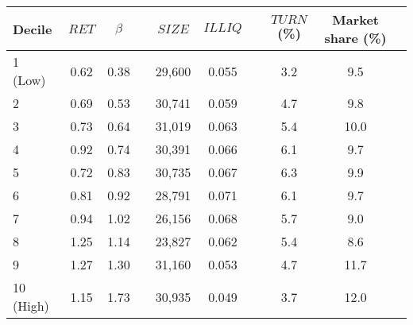 \begin{tabular}{@{}lccccccccc@{}}
	\toprule
	Decile & $\textit{RET}$ & $\beta$ && $\textit{SIZE}$ & $\textit{ILLIQ}$ && $\textit{TURN}$ (\%) & Market share (\%) \\ \midrule
1 (Low) & 0.62 & 0.38 && 29,600 & 0.055 && 3.2 & 9.5 \\
2       & 0.69 & 0.53 && 30,741 & 0.059 && 4.7 & 9.8 \\
3       & 0.73 & 0.64 && 31,019 & 0.063 && 5.4 & 10.0 \\
4       & 0.92 & 0.74 && 30,391 & 0.066 && 6.1 & 9.7 \\
5       & 0.72 & 0.83 && 30,735 & 0.067 && 6.3 & 9.9 \\
6       & 0.81 & 0.92 && 28,791 & 0.071 && 6.1 & 9.7 \\
7       & 0.94 & 1.02 && 26,156 & 0.068 && 5.7 & 9.0 \\
8       & 1.25 & 1.14 && 23,827 & 0.062 && 5.4 & 8.6 \\
9       & 1.27 & 1.30 && 31,160 & 0.053 && 4.7 & 11.7 \\
10 (High) & 1.15 & 1.73 && 30,935 & 0.049 && 3.7 & 12.0 \\
	\bottomrule
\end{tabular}